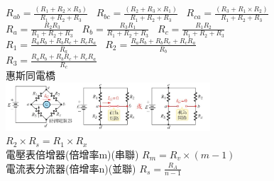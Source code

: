 \documentclass[a4paper,10pt,twocolumn,oneside]{article}
\begin{document}
\begin{normalsize}
$ R_{ab}=\frac{(R_{1}+R_{2} \times R_{3})}{R_{1}+R_{2}+R_{3}}$ \
$ R_{bc}=\frac{(R_{2}+R_{3} \times R_{1})}{R_{1}+R_{2}+R_{3}}$ \
$ R_{ca}=\frac{(R_{3}+R_{1} \times R_{2})}{R_{1}+R_{2}+R_{3}}$ \\
$ R_{a}=\frac{R_{2}R_{3}}{R_{1}+R_{2}+R_{3}}$ \
$ R_{b}=\frac{R_{3}R_{1}}{R_{1}+R_{2}+R_{3}}$ \
$ R_{c}=\frac{R_{1}R_{2}}{R_{1}+R_{2}+R_{3}}$ \\
$ R_{1}=\frac{R_{a}R_{b}+R_{b}R_{c}+R_{c}R_{a}}{R_{a}}$ \
$ R_{2}=\frac{R_{a}R_{b}+R_{b}R_{c}+R_{c}R_{a}}{R_{b}}$\\
$ R_{3}=\frac{R_{a}R_{b}+R_{b}R_{c}+R_{c}R_{a}}{R_{c}}$\\
惠斯同電橋\\
\includegraphics[width=3in]{Wheatstone.jpg}\\
$ R_{2} \times R_{s}=R_{1} \times R_{x} $ \\
電壓表倍增器(倍增率m)(串聯)
$ R_{m}=R_{v}\times (m-1)$\\
電流表分流器(倍增率n)(並聯)
$ R_{s}=\frac{R_{A}}{n-1}$

\end{normalsize}
\end{document}
